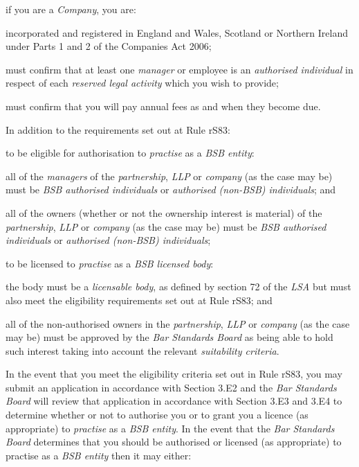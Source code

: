 \item if you are a \emph{Company}, you are:
\rl
\item incorporated and registered in England and Wales, Scotland or
Northern Ireland under Parts 1 and 2 of the Companies Act 2006;\lr\la
\item must confirm that at least one \emph{manager} or employee is an
\emph{authorised individual} in respect of each \emph{reserved legal
activity} which you wish to provide;

\item must confirm that you will pay annual fees as and when they become
due.
\ln
{}

In addition to the requirements set out at Rule rS83:\nl\item to be eligible for authorisation to \emph{practise} as a \emph{BSB
entity}:

\al\item all of the \emph{managers} of the \emph{partnership}, \emph{LLP} or
\emph{company} (as the case may be) must be \emph{BSB authorised
individuals} or \emph{authorised (non-BSB) individuals}; and

\item all of the owners (whether or not the ownership interest is material)
of the \emph{partnership}, \emph{LLP} or \emph{company} (as the case may
be) must be \emph{BSB authorised individuals} or \emph{authorised
(non-BSB) individuals};\la
\item to be licensed to \emph{practise} as a \emph{BSB licensed body}:
\al
\item the body must be a \emph{licensable body}, as defined by section 72
of the \emph{LSA} but must also meet the eligibility requirements set
out at Rule rS83; and

\item all of the non-authorised owners in the \emph{partnership},
\emph{LLP} or \emph{company} (as the case may be) must be approved by
the \emph{Bar Standards Board} as being able to hold such interest
taking into account the relevant \emph{suitability criteria}.\la
\ln
{}

In the event that you meet the eligibility criteria set out in Rule
rS83, you may submit an application in accordance with Section 3.E2 and
the \emph{Bar Standards Board} will review that application in
accordance with Section 3.E3 and 3.E4 to determine whether or not to
authorise you or to grant you a licence (as appropriate) to
\emph{practise} as a \emph{BSB entity}. In the event that the \emph{Bar
Standards Board} determines that you should be authorised or licensed
(as appropriate) to practise as a \emph{BSB entity} then it may either:

